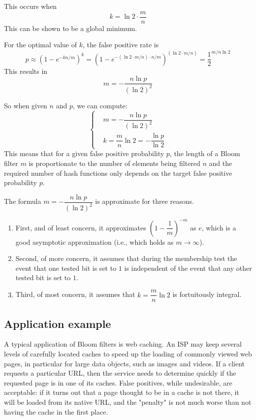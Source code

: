 This occurs when $$k = \ln 2 \cdot \dfrac{m}{n}$$
This can be shown to be a global minimum.

For the optimal value of $k$, the false positive rate is
$$
p
\approx (1 - e^{-kn/m})^k
= (1 - e^{- (\ln 2 \cdot m/n) \cdot n/m})^{(\ln 2 \cdot m/n)}
= \dfrac{1}{2}^{m/n \ln 2}
$$
This results in $$m = - \dfrac{n \ln p}{(\ln 2)^2}$$

So when given $n$ and $p$, we can compute:
$$
\left\{
\begin{aligned}
	& m = - \dfrac{n \ln p}{(\ln 2)^2} \\
	& k = \dfrac{m}{n} \ln 2 = - \dfrac{\ln p}{\ln 2}
\end{aligned}
\right.
$$
This means that for a given false positive probability $p$, the length of a Bloom filter $m$ is proportionate to the number of elements being filtered $n$ and
the required number of hash functions only depends on the target false positive probability $p$.

The formula $m = -\dfrac{n \ln p}{(\ln 2)^2}$ is approximate for three reasons.
\begin{enumerate}
\item First, and of least concern, it approximates $(1 - \dfrac{1}{m})^{-m}$ as $e$, which is a good asymptotic approximation (i.e., which holds as $m \to \infty$).
\item Second, of more concern, it assumes that during the membership test the event that one tested bit is set to $1$ is independent of the event that any other tested bit is set to $1$.
\item Third, of most concern, it assumes that $k = \dfrac{m}{n} \ln 2$ is fortuitously integral.
\end{enumerate}

\subsection{Application example}
A typical application of Bloom filters is web caching.
An ISP may keep several levels of carefully located caches to speed up the loading of commonly viewed web pages, in particular for large data objects, such as images and videos.
If a client requests a particular URL, then the service needs to determine quickly if the requested page is in one of its caches.
False positives, while undesirable, are acceptable: if it turns out that a page thought to be in a cache is not there, it will be loaded from its native URL,
and the "penalty" is not much worse than not having the cache in the first place.


